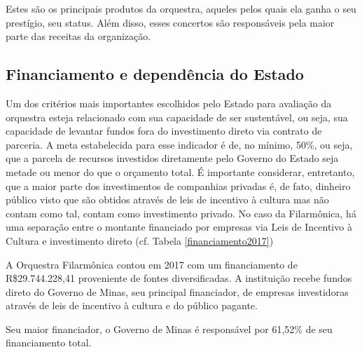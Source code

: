 \documentclass[a4paper, 12pt, openright, oneside, german, french, english, brazil]{abntex2}
\begin{document}
	
	Estes são os principais produtos da orquestra, aqueles pelos quais ela ganha o seu prestígio, seu status. Além disso, esses concertos são responsáveis pela maior parte das receitas da organização.
	
	
	
	\subsection{Financiamento e dependência do Estado}
	
	
	Um dos critérios mais importantes escolhidos pelo Estado para avaliação da orquestra esteja relacionado com sua capacidade de ser sustentável, ou seja, sua capacidade de levantar fundos fora do investimento direto via contrato de parceria. A meta estabelecida para esse indicador é de, no mínimo, 50\%, ou seja, que a parcela de recursos investidos diretamente pelo Governo do Estado seja metade ou menor do que o orçamento total. É importante considerar, entretanto, que a maior parte dos investimentos de companhias privadas é, de fato, dinheiro público visto que são obtidos através de leis de incentivo à cultura mas não contam como tal, contam como investimento privado. No caso da Filarmônica, há uma separação entre o montante financiado por empresas via Leis de Incentivo à Cultura e investimento direto (cf. Tabela \ref{financiamento2017})
	
	A Orquestra Filarmônica contou em 2017 com um financiamento de R\$29.744.228,41 \cite{minas2017aditivo} proveniente de fontes diversificadas. A instituição recebe fundos direto do Governo de Minas, seu principal financiador, de empresas investidoras através de leis de incentivo à cultura e do público pagante.
	
	
	Seu maior financiador, o Governo de Minas é responsável por 61,52\% de seu financiamento total.
	
\end{document}

